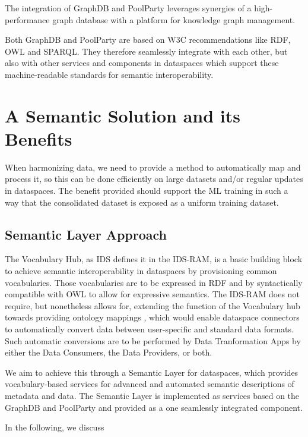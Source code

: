 \documentclass[
  super,
  preprint,
  3p]{elsarticle}
\begin{document}
The integration of GraphDB and PoolParty leverages synergies of a
high-performance graph database with a platform for knowledge graph
management.

Both GraphDB and PoolParty are based on W3C recommendations like RDF,
OWL and SPARQL. They therefore seamlessly integrate with each other, but
also with other services and components in dataspaces which support
these machine-readable standards for semantic interoperability.

\section{A Semantic Solution and its
Benefits}\label{a-semantic-solution-and-its-benefits}

When harmonizing data, we need to provide a method to automatically map
and process it, so this can be done efficiently on large datasets and/or
regular updates in dataspaces. The benefit provided should support the
ML training in such a way that the consolidated dataset is exposed as a
uniform training dataset.

\subsection{Semantic Layer Approach}\label{semantic-layer-approach}

The Vocabulary Hub, as IDS defines it in the IDS-RAM, is a basic
building block to achieve semantic interoperability in dataspaces by
provisioning common vocabularies. Those vocabularies are to be expressed
in RDF and by syntactically compatible with OWL to allow for expressive
semantics. The IDS-RAM does not require, but nonetheless allows for,
extending the function of the Vocabulary hub towards providing ontology
mappings \citep{FunctionalLayerIDSRAM2023b}, which would enable
dataspace connectors to automatically convert data between user-specific
and standard data formats. Such automatic conversions are to be
performed by Data Tranformation Apps by either the Data Consumers, the
Data Providers, or both.

We aim to achieve this through a Semantic Layer for dataspaces, which
provides vocabulary-based services for advanced and automated semantic
descriptions of metadata and data. The Semantic Layer is implemented as
services based on the GraphDB and PoolParty and provided as a one
seamlessly integrated component.

In the following, we discuss
\end{document}
